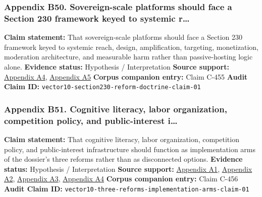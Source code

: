 \documentclass[
  american,
  11pt,
  letterpaper,
]{article}
\begin{document}
\subsubsection{Appendix B50. Sovereign-scale platforms should face a
Section 230 framework keyed to systemic
r\ldots{}}\label{ch-10-appendix-b50-sovereign-scale-platforms-should-face-a-section-230-framework-keyed-to-systemic-r}

\textbf{Claim statement:} That sovereign-scale platforms should face a
Section 230 framework keyed to systemic reach, design, amplification,
targeting, monetization, moderation architecture, and measurable harm
rather than passive-hosting logic alone. \textbf{Evidence status:}
Hypothesis / Interpretation \textbf{Source support:}
\hyperref[ch-10-appendix-a4-a-look-behind-the-screens-examining-the-data-practices-of-social-media-and-video-streaming-services]{Appendix
A4},
\hyperref[ch-10-appendix-a5-social-media-and-youth-mental-health-the-u-s-surgeon-general-s-advisory]{Appendix
A5} \textbf{Corpus companion entry:} Claim C-455 \textbf{Audit Claim
ID:} \texttt{vector10-section230-reform-doctrine-claim-01}

\subsubsection{Appendix B51. Cognitive literacy, labor organization,
competition policy, and public-interest
i\ldots{}}\label{ch-10-appendix-b51-cognitive-literacy-labor-organization-competition-policy-and-public-interest-i}

\textbf{Claim statement:} That cognitive literacy, labor organization,
competition policy, and public-interest infrastructure should function
as implementation arms of the dossier's three reforms rather than as
disconnected options. \textbf{Evidence status:} Hypothesis /
Interpretation \textbf{Source support:}
\hyperref[ch-10-appendix-a1-artificial-intelligence-and-the-future-of-teaching-and-learning-insights-and-recommendations]{Appendix
A1},
\hyperref[ch-10-appendix-a2-in-oxford-handbook-on-ai-governance-the-role-of-workers-in-ai-ethics-and-governance]{Appendix
A2},
\hyperref[ch-10-appendix-a3-interactions-between-artificial-intelligence-and-digital-public-infrastructure-concepts-benefits-and-challenges]{Appendix
A3},
\hyperref[ch-10-appendix-a4-a-look-behind-the-screens-examining-the-data-practices-of-social-media-and-video-streaming-services]{Appendix
A4} \textbf{Corpus companion entry:} Claim C-456 \textbf{Audit Claim
ID:} \texttt{vector10-three-reforms-implementation-arms-claim-01}
\end{document}
